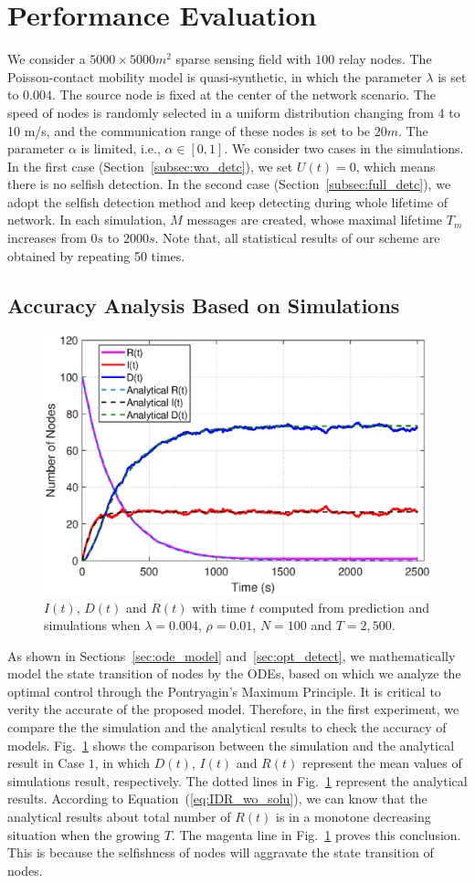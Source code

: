 \section{Performance Evaluation}
\label{sec:pe}
We consider a $5000 \times 5000 m^2$ sparse sensing field with
$100$ relay nodes.
The Poisson-contact
mobility model is quasi-synthetic,
in which the parameter $\lambda$ is set to $0.004$.
The source node is fixed at the center of the network scenario. 
The speed of nodes is randomly selected in a uniform distribution 
changing from 4 to 10 m/s,
and the communication range of these nodes is set to be $20$$m$.
The parameter $\alpha$ is limited, 
i.e.,
$\alpha \in [0, 1]$.
We consider two cases in the simulations.
In the first case (Section~\ref{subsec:wo_detc}),
we set $U(t)=0$,
which means there is no selfish detection. 
In the second case (Section~\ref{subsec:full_detc}),
we adopt the selfish detection method and keep detecting during whole lifetime of network.
In each simulation,
$M$ messages are created,
whose maximal lifetime $T_m$ increases from $0$$s$ to $2000$$s$.
Note that,
all statistical results of our scheme are obtained by
repeating 50 times.

\subsection{Accuracy Analysis Based on Simulations}
\label{subsec:pe_valid}
\begin{figure}
  \includegraphics[width=.45\textwidth]{fig/twohop_without_detection.eps}
  \caption{$I(t)$, $D(t)$ and $R(t)$ with time $t$ computed from prediction and simulations
  when $\lambda = 0.004$, $\rho = 0.01$, $N=100$ and $T=2,500$.}
  \label{fig:twohop_predict_wod}
\end{figure}
As shown in Sections~\ref{sec:ode_model} and~\ref{sec:opt_detect},
we mathematically model the state transition of nodes by the ODEs,
based on which we analyze the optimal control through the Pontryagin's Maximum Principle.
It is critical to verity the accurate of the proposed model.
Therefore, 
in the first experiment,
we compare the the simulation and the analytical results to check the accuracy of models.
Fig.~\ref{fig:twohop_predict_wod} shows the comparison between the simulation and the analytical result in Case $1$, 
in which $D(t)$, $I(t)$ and $R(t)$ represent the mean values
of simulations result, 
respectively.
The dotted lines in Fig.~\ref{fig:twohop_predict_wod} represent the analytical results.
According to Equation~(\ref{eq:IDR_wo_solu}),
we can know that the analytical results about total number of $R(t)$ is in a monotone decreasing 
situation when the growing $T$. 
The magenta line in Fig.~\ref{fig:twohop_predict_wod} proves this conclusion.
This is because the selfishness of nodes will aggravate the state transition of nodes. 

